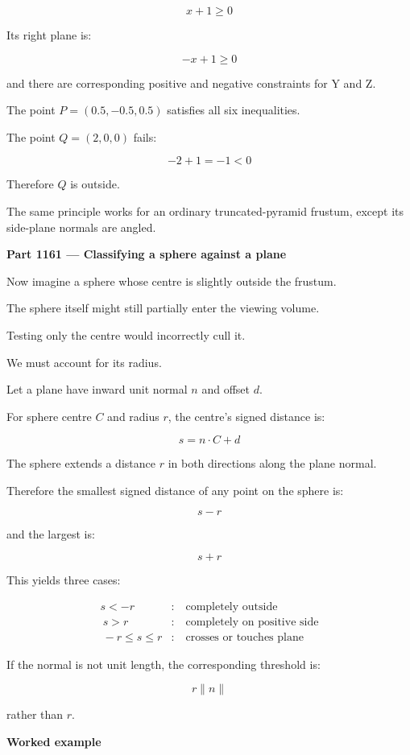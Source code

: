 \[
x+1\ge0
\]

Its right plane is:

\[
-x+1\ge0
\]

and there are corresponding positive and negative constraints for Y and Z.

The point \(P=(0.5,-0.5,0.5)\) satisfies all six inequalities.

The point \(Q=(2,0,0)\) fails:

\[
-2+1=-1<0
\]

Therefore \(Q\) is outside.

The same principle works for an ordinary truncated-pyramid frustum, except its side-plane normals are angled.

\textbf{Part 1161 --- Classifying a sphere against a plane}

Now imagine a sphere whose centre is slightly outside the frustum.

The sphere itself might still partially enter the viewing volume.

Testing only the centre would incorrectly cull it.

We must account for its radius.

Let a plane have inward unit normal \(n\) and offset \(d\).

For sphere centre \(C\) and radius \(r\), the centre's signed distance is:

\[
s=n\cdot C+d
\]

The sphere extends a distance \(r\) in both directions along the plane normal.

Therefore the smallest signed distance of any point on the sphere is:

\[
s-r
\]

and the largest is:

\[
s+r
\]

This yields three cases:

\[
\boxed{ \begin{aligned} s<-r&:\quad\text{completely outside}\\\ s>r&:\quad\text{completely on positive side}\\\ -r\le s\le r&:\quad\text{crosses or touches plane} \end{aligned} }
\]

If the normal is not unit length, the corresponding threshold is:

\[
r\|n\|
\]

rather than \(r\).

\textbf{Worked example}

